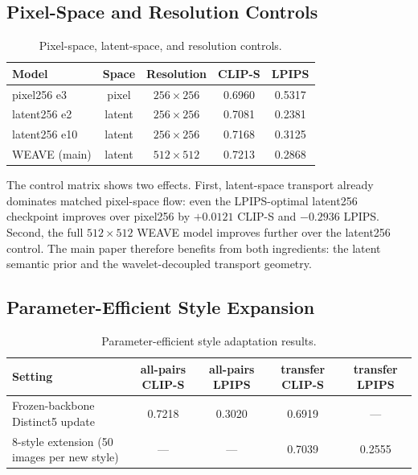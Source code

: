 \documentclass[10pt,letterpaper]{article}
\begin{document}
\subsection{Pixel-Space and Resolution Controls}
\label{sec:pixel_latent}

\begin{table}[h]
\centering
\caption{Pixel-space, latent-space, and resolution controls.}
\label{tab:pixel_latent}
\small
\begin{tabular}{@{}lcccc@{}}
\toprule
Model & Space & Resolution & CLIP-S & LPIPS \\
\midrule
pixel256 e3 & pixel & $256\times256$ & 0.6960 & 0.5317 \\
latent256 e2 & latent & $256\times256$ & 0.7081 & 0.2381 \\
latent256 e10 & latent & $256\times256$ & 0.7168 & 0.3125 \\
WEAVE (main) & latent & $512\times512$ & 0.7213 & 0.2868 \\
\bottomrule
\end{tabular}
\end{table}

The control matrix shows two effects. First, latent-space transport already dominates matched pixel-space flow: even the LPIPS-optimal latent256 checkpoint improves over pixel256 by $+0.0121$ CLIP-S and $-0.2936$ LPIPS. Second, the full $512\times512$ WEAVE model improves further over the latent256 control. The main paper therefore benefits from both ingredients: the latent semantic prior and the wavelet-decoupled transport geometry.

\subsection{Parameter-Efficient Style Expansion}
\label{sec:fewshot}

\begin{table}[h]
\centering
\caption{Parameter-efficient style adaptation results.}
\label{tab:fewshot}
\small
\begin{tabular}{@{}lcccc@{}}
\toprule
Setting & all-pairs CLIP-S & all-pairs LPIPS & transfer CLIP-S & transfer LPIPS \\
\midrule
Frozen-backbone Distinct5 update & 0.7218 & 0.3020 & 0.6919 & --- \\
8-style extension (50 images per new style) & --- & --- & 0.7039 & 0.2555 \\
\bottomrule
\end{tabular}
\end{table}
\end{document}
